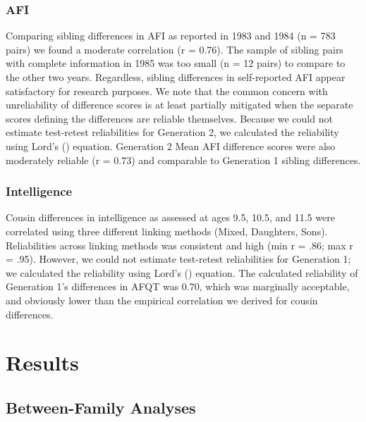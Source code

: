 \documentclass[a4paper,man,apacite,natbib,12pt,longtable,mask]{apa6}\usepackage[]{graphicx}\usepackage[]{color}
\begin{document}
\subsubsection{AFI} Comparing sibling differences in AFI as reported in 1983 and 1984 (n = 783 pairs) we found a moderate correlation (r = 0.76). The sample of sibling pairs with complete information in 1985 was too small (n = 12 pairs) to compare to the other two years. Regardless, sibling differences in self-reported AFI appear satisfactory for research purposes. We note that the common concern with unreliability of difference scores is at least partially mitigated when the separate scores defining the differences are reliable themselves. Because we could not estimate test-retest reliabilities for Generation 2, we calculated the reliability using Lord's (\citeyear{Lord1963}) equation. Generation 2 Mean AFI difference scores were also moderately reliable (r = 0.73) and comparable to Generation 1 sibling differences.

\subsubsection{Intelligence} Cousin differences in intelligence as assessed at ages 9.5, 10.5, and 11.5 were correlated using three different linking methods (Mixed, Daughters, Sons). Reliabilities across linking methods was consistent and high (min r = .86; max r = .95). However, we could not estimate test-retest reliabilities for Generation 1; we calculated the reliability using Lord's (\citeyear{Lord1963}) equation. The calculated reliability of Generation 1's differences in AFQT was 0.70, which was marginally acceptable, and obviously lower than the empirical correlation we derived for cousin differences.%

\section{Results}

%
\subsection{Between-Family Analyses}

\end{document}
